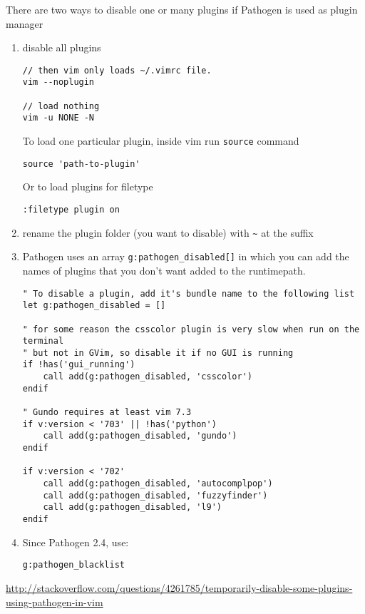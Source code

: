 There are two ways to disable one or many plugins if Pathogen is used as plugin
manager
\begin{enumerate}
  
  \item disable all plugins
\begin{verbatim}
// then vim only loads ~/.vimrc file.
vim --noplugin

// load nothing
vim -u NONE -N 
\end{verbatim}

To load one particular plugin, inside vim run \verb!source! command
\begin{verbatim}
source 'path-to-plugin'
\end{verbatim}

Or to load plugins for filetype
\begin{verbatim}
:filetype plugin on 
\end{verbatim}

  \item rename the plugin folder (you want to disable) with \verb!~! at the
  suffix
  
  \item Pathogen uses an array \verb!g:pathogen_disabled[]! in which
you can add the names of plugins that you don't want added to the runtimepath. 

\begin{verbatim}
" To disable a plugin, add it's bundle name to the following list
let g:pathogen_disabled = []

" for some reason the csscolor plugin is very slow when run on the terminal
" but not in GVim, so disable it if no GUI is running
if !has('gui_running')
    call add(g:pathogen_disabled, 'csscolor')
endif

" Gundo requires at least vim 7.3
if v:version < '703' || !has('python')
    call add(g:pathogen_disabled, 'gundo')
endif

if v:version < '702'
    call add(g:pathogen_disabled, 'autocomplpop')
    call add(g:pathogen_disabled, 'fuzzyfinder')
    call add(g:pathogen_disabled, 'l9')
endif
\end{verbatim}
  \item Since Pathogen 2.4, use:  
\begin{verbatim}
g:pathogen_blacklist
\end{verbatim}
\end{enumerate} 
\url{http://stackoverflow.com/questions/4261785/temporarily-disable-some-plugins-using-pathogen-in-vim}

